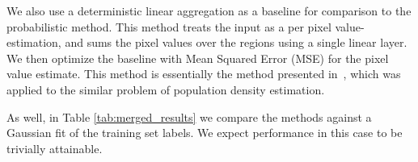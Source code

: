\documentclass[10pt,twocolumn,a4paper]{article}
\newcommand{\cash}[1]{\SI{#1}[\$]{}}
\begin{document}
We also use a deterministic linear aggregation as a baseline for comparison to the probabilistic method. This method treats the input as a per pixel value-estimation, and sums the pixel values over the regions using a single linear layer. We then optimize the baseline with Mean Squared Error (MSE) for the pixel value estimate. This method is essentially the method presented in~\cite{jacobs2018weakly}, which was applied to the similar problem of population density estimation.

As well, in Table \ref{tab:merged_results} we compare the methods against a Gaussian fit of the training set labels. We expect performance in this case to be trivially attainable.





 
\end{document}
